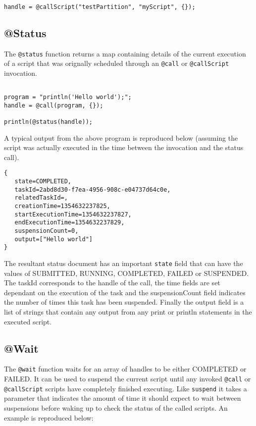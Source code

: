 \begin{lstlisting}[caption={Example @CallScript}]

handle = @callScript("testPartition", "myScript", {});

\end{lstlisting}

\subsection{@Status}

The \verb+@status+ function returns a map containing details of the current execution of a script that was orignally scheduled through an \verb+@call+ or \verb+@callScript+ invocation. 

\begin{lstlisting}[caption={Example @Status}]

program = "println('Hello world');";
handle = @call(program, {});

println(@status(handle));

\end{lstlisting}

A typical output from the above program is reproduced below (assuming the script was actually executed in the time between the invocation and the status call).

\begin{Verbatim}
{
   state=COMPLETED, 
   taskId=2abd8d30-f7ea-4956-908c-e04737d64c0e, 
   relatedTaskId=, 
   creationTime=1354632237825, 
   startExecutionTime=1354632237827, 
   endExecutionTime=1354632237829, 
   suspensionCount=0, 
   output=["Hello world"]
}
\end{Verbatim}

The resultant status document has an important \verb+state+ field that can have the values of SUBMITTED, RUNNING, COMPLETED, FAILED or SUSPENDED. The taskId corresponds to the handle of the call, the time fields are set dependant on the execution of the task and the suspensionCount field indicates the number of times this task has been suspended. Finally the output field is a list of strings that contain any output from any print or println statements in the executed script.

\subsection{@Wait}
The \verb+@wait+ function waits for an array of handles to be either COMPLETED or FAILED. It can be used to suspend the current script until any invoked \verb+@call+ or \verb+@callScript+ scripts have completely finished executing. Like \verb+suspend+ it takes a parameter that indicates the amount of time it should expect to wait between suspensions before waking up to check the status of the called scripts. An example is reproduced below:

